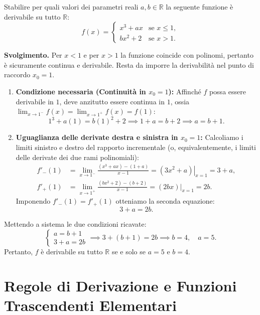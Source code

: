 \begin{esbox}
Stabilire per quali valori dei parametri reali $a, b \in \mathbb{R}$ la seguente funzione è derivabile su tutto $\mathbb{R}$:
\[
    f(x) = \begin{cases} x^3 + ax & \text{se } x \le 1, \\ bx^2 + 2 & \text{se } x > 1. \end{cases}
\]

\medskip
\noindent\textbf{Svolgimento.}
Per $x < 1$ e per $x > 1$ la funzione coincide con polinomi, pertanto è sicuramente continua e derivabile. Resta da imporre la derivabilità nel punto di raccordo $x_0 = 1$.

\begin{enumerate}
    \item \textbf{Condizione necessaria (Continuità in $x_0 = 1$):} Affinché $f$ possa essere derivabile in $1$, deve anzitutto essere continua in $1$, ossia $\lim_{x \to 1^-} f(x) = \lim_{x \to 1^+} f(x) = f(1)$:
    \[
        1^3 + a(1) = b(1)^2 + 2 \implies 1 + a = b + 2 \implies a = b + 1.
    \]

    \item \textbf{Uguaglianza delle derivate destra e sinistra in $x_0 = 1$:} Calcoliamo i limiti sinistro e destro del rapporto incrementale (o, equivalentemente, i limiti delle derivate dei due rami polinomiali):
    \begin{align*}
        f'_{-}(1) &= \lim_{x \to 1^-} \frac{(x^3 + ax) - (1 + a)}{x - 1} = \left. (3x^2 + a) \right|_{x=1} = 3 + a, \\
        f'_{+}(1) &= \lim_{x \to 1^+} \frac{(bx^2 + 2) - (b + 2)}{x - 1} = \left. (2bx) \right|_{x=1} = 2b.
    \end{align*}
    Imponendo $f'_{-}(1) = f'_{+}(1)$ otteniamo la seconda equazione:
    \[
        3 + a = 2b.
    \]
\end{enumerate}
Mettendo a sistema le due condizioni ricavate:
\[
    \begin{cases} a = b + 1 \\ 3 + a = 2b \end{cases} \implies 3 + (b + 1) = 2b \implies b = 4, \quad a = 5.
\]
Pertanto, $f$ è derivabile su tutto $\mathbb{R}$ se e solo se $a = 5$ e $b = 4$.
\end{esbox}

\section{Regole di Derivazione e Funzioni Trascendenti Elementari}


